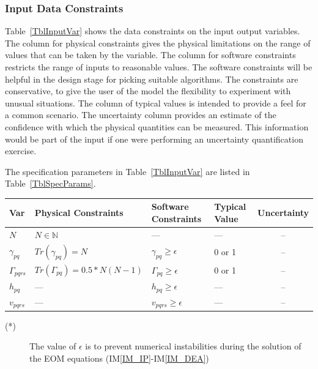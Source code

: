 \documentclass[12pt]{article}
\newcommand{\iref}[1]{IM\ref{#1}}
\begin{document}
\subsubsection{Input Data Constraints} \label{sec_DataConstraints}    

Table~\ref{TblInputVar} shows the data constraints on the input output
variables.  The column for physical constraints gives the physical limitations
on the range of values that can be taken by the variable.  The column for
software constraints restricts the range of inputs to reasonable values.  The
software constraints will be helpful in the design stage for picking suitable
algorithms.  The constraints are conservative, to give the user of the model the
flexibility to experiment with unusual situations.  The column of typical values
is intended to provide a feel for a common scenario.  The uncertainty column
provides an estimate of the confidence with which the physical quantities can be
measured.  This information would be part of the input if one were performing an
uncertainty quantification exercise.

The specification parameters in Table~\ref{TblInputVar} are listed in
Table~\ref{TblSpecParams}.

\begin{table}[!h]
  \caption{Input Variables} \label{TblInputVar}
  \renewcommand{\arraystretch}{1.2}
\noindent \begin{longtable*}{l l l l c} 
  \toprule
  \textbf{Var} & \textbf{Physical Constraints} & \textbf{Software Constraints} &
                             \textbf{Typical Value} & \textbf{Uncertainty}\\
  \midrule 
   $N$ & $N \in \mathbb{N}$ & --- & --- & --\\
  $\gamma_{pq}$ & $Tr(\gamma_{pq}) = N$ & $\gamma_{pq} \ge \epsilon$ & 0 or 
  1 
  & 
  --\\
  $\Gamma_{pqrs}$ & $Tr(\Gamma_{pq})=0.5*N(N-1)$ & $\Gamma_{pq} \ge \epsilon$ & 
  0 
  or 
  1 & 
  --\\
  $h_{pq}$ & --- & $h_{pq} \ge \epsilon$ & --- & --  \\
  $v_{pqrs}$ & --- & $v_{pqrs} \ge \epsilon$ & --- & --  \\
  \bottomrule
\end{longtable*}
\end{table}

\noindent 
\begin{description}
\item[(*)] The value of $\epsilon$ is to prevent numerical instabilities during 
the solution of the EOM equations (\iref{IM_IP}-\iref{IM_DEA})
\end{description}
\end{document}
